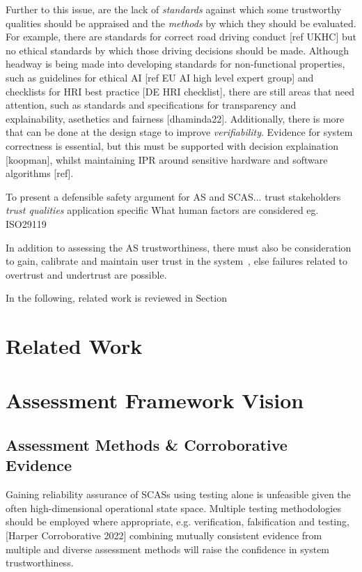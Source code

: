 Further to this issue, are the lack of \emph{standards} against which some trustworthy qualities should be appraised and the \emph{methods} by which they should be evaluated. For example, there are standards for correct road driving conduct [ref UKHC] but no ethical standards by which those driving decisions should be made. 
%
Although headway is being made into developing standards for non-functional properties, such as guidelines for ethical AI [ref EU AI high level expert group] and checklists for HRI best practice [DE HRI checklist], there are still areas that need attention, such as standards and specifications for transparency and explainability, asethetics and fairness [dhaminda22]. 
%
Additionally, there is more that can be done at the design stage to improve \emph{verifiability}. Evidence for system correctness is essential, but this must be supported with decision explaination [koopman], whilst maintaining IPR around sensitive hardware and software algorithms [ref]. 



%
To present a defensible safety argument for AS and SCAS...
trust stakeholders
\emph{trust qualities}
application specific
What human factors are considered eg. ISO29119


In addition to assessing the AS trustworthiness, there must also be consideration to gain, calibrate and maintain user trust in the system~\cite{kok2020trust, Chiou2021}, else failures related to overtrust and undertrust are possible. 


In the following, related work is reviewed in Section

\section{Related Work}\label{Related_work}


\section{Assessment Framework Vision}\label{Assessment_Framework_Vision}


\subsection{Assessment Methods \& Corroborative Evidence}
Gaining reliability assurance of SCASs using testing alone is unfeasible given the often high-dimensional operational state space. Multiple testing methodologies should be employed where appropriate, e.g. verification, falsification and testing, [Harper Corroborative 2022] combining mutually consistent evidence from multiple and diverse assessment methods will raise the confidence in system trustworthiness.

